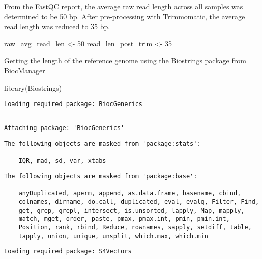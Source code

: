 \documentclass[
  letterpaper,
  DIV=11,
  numbers=noendperiod]{scrartcl}
\newenvironment{Shaded}{\begin{snugshade}}{\end{snugshade}}
\newcommand{\DecValTok}[1]{\textcolor[rgb]{0.68,0.00,0.00}{#1}}
\newcommand{\FunctionTok}[1]{\textcolor[rgb]{0.28,0.35,0.67}{#1}}
\newcommand{\NormalTok}[1]{\textcolor[rgb]{0.00,0.23,0.31}{#1}}
\newcommand{\OtherTok}[1]{\textcolor[rgb]{0.00,0.23,0.31}{#1}}
\begin{document}
From the FastQC report, the average raw read length across all samples
was determined to be 50 bp. After pre-processing with Trimmomatic, the
average read length was reduced to 35 bp.

\begin{Shaded}
\begin{Highlighting}[]
\NormalTok{raw\_avg\_read\_len }\OtherTok{\textless{}{-}} \DecValTok{50}
\NormalTok{read\_len\_post\_trim }\OtherTok{\textless{}{-}} \DecValTok{35}
\end{Highlighting}
\end{Shaded}

Getting the length of the reference genome using the Biostrings package
from BiocManager

\begin{Shaded}
\begin{Highlighting}[]
\FunctionTok{library}\NormalTok{(Biostrings)}
\end{Highlighting}
\end{Shaded}

\begin{verbatim}
Loading required package: BiocGenerics
\end{verbatim}

\begin{verbatim}

Attaching package: 'BiocGenerics'
\end{verbatim}

\begin{verbatim}
The following objects are masked from 'package:stats':

    IQR, mad, sd, var, xtabs
\end{verbatim}

\begin{verbatim}
The following objects are masked from 'package:base':

    anyDuplicated, aperm, append, as.data.frame, basename, cbind,
    colnames, dirname, do.call, duplicated, eval, evalq, Filter, Find,
    get, grep, grepl, intersect, is.unsorted, lapply, Map, mapply,
    match, mget, order, paste, pmax, pmax.int, pmin, pmin.int,
    Position, rank, rbind, Reduce, rownames, sapply, setdiff, table,
    tapply, union, unique, unsplit, which.max, which.min
\end{verbatim}

\begin{verbatim}
Loading required package: S4Vectors
\end{verbatim}
\end{document}
